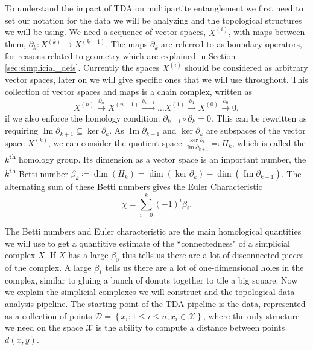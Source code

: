 \documentclass{article}
\newcommand{\set}[1]{\left\{ #1 \right\}}
\newcommand{\ts}{\textsuperscript}
\DeclareMathOperator{\im}{Im}
\begin{document}
To understand the impact of TDA on multipartite entanglement we first need to set our notation for the data we will be analyzing and the topological structures we will be using. We need a sequence of vector spaces, $X^{(i)}$, with maps between them, $\partial_k : X^{(k)} \to X^{(k - 1)}$. The maps $\partial_k$ are referred to as boundary operators, for reasons related to geometry which are explained in Section \ref{sec:simplicial_defs}. Currently the spaces $X^{(i)}$ should be considered as arbitrary vector spaces, later on we will give specific ones that we will use throughout. This collection of vector spaces and maps is a chain complex, written as
\begin{equation}
    X^{(n)} \xrightarrow{\partial_n} X^{(n-1)} \xrightarrow{\partial_{n-1}} \ldots X^{(1)} \xrightarrow{\partial_1} X^{(0)} \xrightarrow{\partial_0} 0,
\end{equation}
if we also enforce the homology condition: $\partial_{k + 1} \circ \partial_{k} = 0$. This can be rewritten as requiring $\im \partial_{k + 1} \subseteq \ker \partial_{k}$. As $\im \partial_{k + 1}$ and $\ker \partial_{k}$ are subspaces of the vector space $X^{(k)}$, we can consider the quotient space $\frac{\ker \partial_{k}}{\im \partial_{k + 1}} \eqqcolon H_{k}$, which is called the $k$\ts{th} homology group. Its dimension as a vector space is an important number, the $k$\ts{th} Betti number $\beta_k \coloneqq \dim(H_k) = \dim(\ker \partial_k) - \dim(\im \partial_{k + 1})$. The alternating sum of these Betti numbers gives the Euler Characteristic 
\begin{equation}
    \chi = \sum_{i = 0}^{k} (-1)^i \beta_i.
\end{equation}

The Betti numbers and Euler characteristic are the main homological quantities we will use to get a quantitive estimate of the ``connectedness" of a simplicial complex $X$. If $X$ has a large $\beta_0$ this tells us there are a lot of disconnected pieces of the complex. A large $\beta_1$ tells us there are a lot of one-dimensional holes in the complex, similar to gluing a bunch of donuts together to tile a big square. Now we explain the simplicial complexes we will construct and the topological data analysis pipeline. The starting point of the TDA pipeline is the data, represented as a collection of points $\mathcal{D} = \set{x_i : 1 \leq i \leq n, x_i \in \mathcal{X}}$, where the only structure we need on the space $\mathcal{X}$ is the ability to compute a distance between points $d(x, y)$. 
\end{document}
